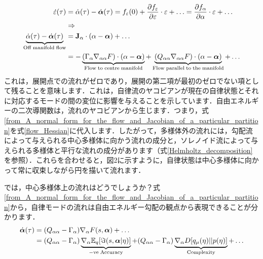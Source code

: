 \documentclass[a4paper, titlepage]{jsarticle}
\begin{document}
\begin{equation}\label{off_manifold_flow}
    \begin{aligned}
        \dot{\varepsilon}(\tau) &= \dot{\alpha}(\tau) - \dot{\bm{\alpha}}(\tau) = f_\varepsilon\qty(0)+\frac{\partial f_\varepsilon}{\partial \varepsilon}\cdot\varepsilon+\ldots=\frac{\partial f_\alpha}{\partial \alpha} \cdot \varepsilon + \dots \\
        &\Rightarrow \\
        \underbrace{\dot{\alpha}(\tau)-\dot{\bm{\alpha}}(\tau)}_{\mathrm{Off\;manifold\;flow}}&=\mathbf{J}_\alpha \cdot (\alpha - \bm{\alpha}) + \dots \\
        &=-\underbrace{\qty(\Gamma_{\alpha}\nabla_{\alpha\alpha}F)\cdot\qty(\alpha-\bm{\alpha})}_{\mathrm{Flow\;to\;centre\;manifold}}+\underbrace{\qty(Q_{\alpha\alpha}\nabla_{\alpha\alpha}F)\cdot\qty(\alpha-\bm{\alpha})}_{\mathrm{Flow\;parallel\;to\;the\;manifold}}+\dots
    \end{aligned}
\end{equation}
これは，展開点での流れがゼロであり，展開の第二項が最初のゼロでない項として残ることを意味します．これは，自律流のヤコビアンが現在の自律状態とそれに対応するモードの間の変位に影響を与えることを示しています．自由エネルギーの二次導関数は，流れのヤコビアンから生じます．つまり，式\eqref{from_A_normal_form_for_the_flow_and_Jacobian_of_a_particular_partition}を式\eqref{flow_Hessian}に代入します．したがって，多様体外の流れには，勾配流によって与えられる中心多様体に向かう流れの成分と，ソレノイド流によって与えられる多様体と平行な流れの成分があります（式\eqref{Helmholtz_decomposition}を参照）．これらを合わせると，図2に示すように，自律状態は中心多様体に向かって常に収束しながら円を描いて流れます．
\par
では，中心多様体上の流れはどうでしょうか？式\eqref{from_A_normal_form_for_the_flow_and_Jacobian_of_a_particular_partition}から，自律モードの流れは自由エネルギー勾配の観点から表現できることが分かります．
\begin{equation}
    \begin{aligned}
        \dot{\bm{\alpha}}(\tau) &= (Q_{\alpha\alpha} - \Gamma_{\alpha}) \nabla_\alpha F(s, \bm{\alpha}) + \dots \\
        &= (Q_{\alpha\alpha} - \Gamma_{\alpha}) \underbrace{\nabla_\alpha\mathbb{E}_q[\imaginary(s, \bm{\alpha}| \eta)]}_{\mathrm{-ve\;Accuracy}} + (Q_{\alpha\alpha} - \Gamma_{\alpha})\underbrace{\nabla_\alpha D[q_{\mu}(\eta) || p(\eta)]}_{\mathrm{Complexity}} + \dots
    \end{aligned}
\end{equation}
\end{document}
